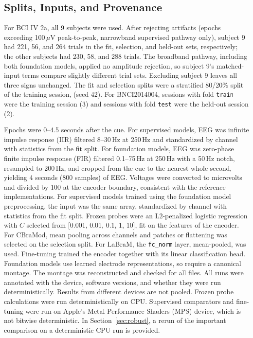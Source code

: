 \documentclass[conference]{IEEEtran}
\begin{document}
\subsection{Splits, Inputs, and Provenance}

For BCI IV 2a, all 9 subjects were used. After rejecting artifacts (epochs exceeding 100\,$\mu$V peak-to-peak, narrowband supervised pathway only), subject 9 had 221, 56, and 264 trials in the fit, selection, and held-out sets, respectively; the other subjects had 230, 58, and 288 trials. The broadband pathway, including both foundation models, applied no amplitude rejection, so subject 9's matched-input terms compare slightly different trial sets. Excluding subject 9 leaves all three signs unchanged. The fit and selection splits were a stratified 80/20\% split of the training session, (seed 42). For BNCI2014004, sessions with fold \texttt{train} were the training session (3) and sessions with fold \texttt{test} were the held-out session (2).

Epochs were 0--4.5 seconds after the cue. For supervised models, EEG was infinite impulse response (IIR) filtered 8--30\,Hz at 250\,Hz and standardized by channel with statistics from the fit split. For foundation models, EEG was zero-phase finite impulse response (FIR) filtered 0.1--75\,Hz at 250\,Hz with a 50\,Hz notch, resampled to 200\,Hz, and cropped from the cue to the nearest whole second, yielding 4 seconds (800 samples) of EEG. Voltages were converted to microvolts and divided by 100 at the encoder boundary, consistent with the reference implementations. For supervised models trained using the foundation model preprocessing, the input was the same array, standardized by channel with statistics from the fit split. Frozen probes were an L2-penalized logistic regression with $C$ selected from [0.001, 0.01, 0.1, 1, 10], fit on the features of the encoder. For CBraMod, mean pooling across channels and patches or flattening was selected on the selection split. For LaBraM, the \texttt{fc\_norm} layer, mean-pooled, was used. Fine-tuning trained the encoder together with its linear classification head. Foundation models use learned electrode representations, so require a canonical montage. The montage was reconstructed and checked for all files. All runs were annotated with the device, software versions, and whether they were run deterministically. Results from different devices are not pooled. Frozen probe calculations were run deterministically on CPU. Supervised comparators and fine-tuning were run on Apple's Metal Performance Shaders (MPS) device, which is not bitwise deterministic. In Section~\ref{sec:robust}, a rerun of the important comparison on a deterministic CPU run is provided.
\end{document}
